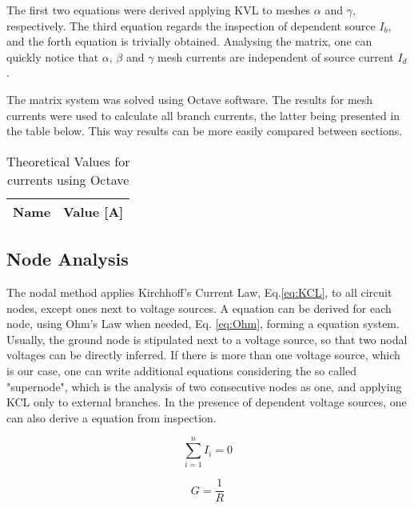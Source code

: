 \par The first two equations were derived applying KVL to meshes $\alpha$ and $\gamma$, respectively. The third equation regards the inspection of dependent source $I_b$, and the forth equation is trivially obtained.
Analysing the matrix, one can quickly notice that $\alpha$, $\beta$ and $\gamma$ mesh currents are independent of source current $I_d$.

\par The matrix system was solved using Octave software. The results for mesh currents were used to calculate all branch currents, the latter being presented in the table below. This way results can be more easily compared between sections.



\begin{table}[H]
  \centering
  \begin{tabular}{|l|r|}
    \hline
    {\bf Name} & {\bf Value [A]} \\ \hline
    
  \end{tabular}
  \caption{Theoretical Values for currents using Octave}
  \label{tab:TCurrents}
\end{table}

\subsection{Node Analysis}
\par The nodal method applies Kirchhoff's Current Law, Eq.\ref{eq:KCL}, to all circuit nodes, except ones next to voltage sources. A equation can be derived for each node, using Ohm's Law when needed, Eq. \ref{eq:Ohm}, forming a equation system. Usually, the ground node is stipulated next to a voltage source, so that two nodal voltages can be directly inferred. If there is more than one voltage source, which is our case, one can write additional equations considering the so called "supernode", which is the analysis of two consecutive nodes as one, and applying KCL only to external branches. In the presence of dependent voltage sources, one can also derive a equation from inspection.
\begin{multicols}{2}
\begin{equation}
    \sum_{i=1}^{n} I_i = 0
    \label{eq:KCL}
\end{equation}

\begin{equation}
    G = \frac{1}{R}
    \label{eq:G}
\end{equation}
\end{multicols}


